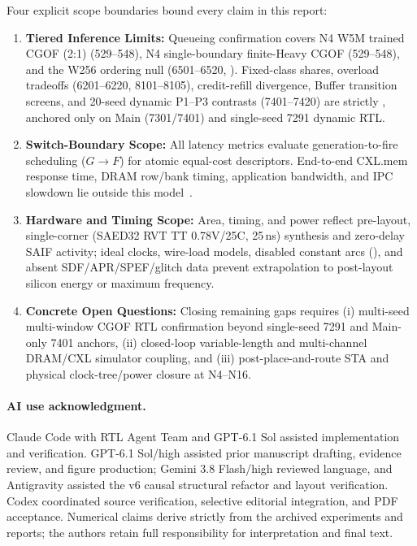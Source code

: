 Four explicit scope boundaries bound every claim in this report:
\begin{enumerate}
\item \textbf{Tiered Inference Limits:} Queueing confirmation covers N4 W5M trained CGOF (2:1) (529--548), N4 single-boundary finite-Heavy CGOF (529--548), and the W256 ordering null (6501--6520, ). Fixed-class shares, overload tradeoffs (6201--6220, 8101--8105), credit-refill divergence, Buffer transition screens, and 20-seed dynamic P1--P3 contrasts (7401--7420) are strictly , anchored only on Main (7301/7401) and single-seed 7291 dynamic RTL.
\item \textbf{Switch-Boundary Scope:} All latency metrics evaluate generation-to-fire scheduling ($G\rightarrow F$) for atomic equal-cost descriptors. End-to-end CXL.mem response time, DRAM row/bank timing, application bandwidth, and IPC slowdown lie outside this model~\cite{cxl_interplay,cxldmsim}.
\item \textbf{Hardware and Timing Scope:} Area, timing, and power reflect pre-layout, single-corner (SAED32 RVT TT 0.78V/25C, 25\,ns) synthesis and zero-delay SAIF activity; ideal clocks, wire-load models, disabled constant arcs (), and absent SDF/APR/SPEF/glitch data prevent extrapolation to post-layout silicon energy or maximum frequency.
\item \textbf{Concrete Open Questions:} Closing remaining gaps requires (i) multi-seed multi-window CGOF RTL confirmation beyond single-seed 7291 and Main-only 7401 anchors, (ii) closed-loop variable-length and multi-channel DRAM/CXL simulator coupling, and (iii) post-place-and-route STA and physical clock-tree/power closure at N4--N16.
\end{enumerate}

\paragraph{AI use acknowledgment.}
Claude Code with RTL Agent Team and GPT-6.1 Sol assisted implementation and verification. GPT-6.1 Sol/high assisted prior manuscript drafting, evidence review, and figure production; Gemini 3.8 Flash/high reviewed language, and Antigravity assisted the v6 causal structural refactor and layout verification. Codex coordinated source verification, selective editorial integration, and PDF acceptance. Numerical claims derive strictly from the archived experiments and reports; the authors retain full responsibility for interpretation and final text.
